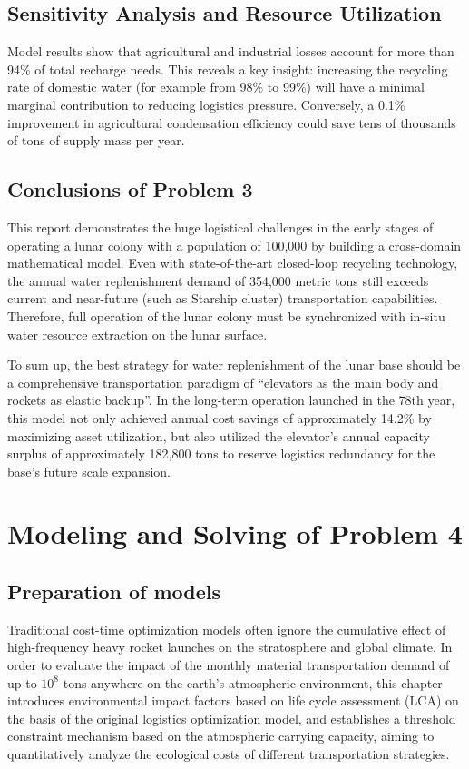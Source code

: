 \subsection{Sensitivity Analysis and Resource Utilization}
Model results show that agricultural and industrial losses account for more than 94\% of total recharge needs. This reveals a key insight: increasing the recycling rate of domestic water (for example from 98\% to 99\%) will have a minimal marginal contribution to reducing logistics pressure. Conversely, a 0.1\% improvement in agricultural condensation efficiency could save tens of thousands of tons of supply mass per year.

\subsection{Conclusions of Problem 3}
This report demonstrates the huge logistical challenges in the early stages of operating a lunar colony with a population of 100,000 by building a cross-domain mathematical model. Even with state-of-the-art closed-loop recycling technology, the annual water replenishment demand of 354,000 metric tons still exceeds current and near-future (such as Starship cluster) transportation capabilities. Therefore, full operation of the lunar colony must be synchronized with in-situ water resource extraction on the lunar surface.

To sum up, the best strategy for water replenishment of the lunar base should be a comprehensive transportation paradigm of “elevators as the main body and rockets as elastic backup”. In the long-term operation launched in the 78th year, this model not only achieved annual cost savings of approximately 14.2\% by maximizing asset utilization, but also utilized the elevator’s annual capacity surplus of approximately 182,800 tons to reserve logistics redundancy for the base’s future scale expansion.

\section{Modeling and Solving of Problem 4}
\subsection{Preparation of models}
Traditional cost-time optimization models often ignore the cumulative effect of high-frequency heavy rocket launches on the stratosphere and global climate.
In order to evaluate the impact of the monthly material transportation demand of up to $10^8$ tons anywhere on the earth's atmospheric environment, this chapter introduces environmental impact factors based on life cycle assessment (LCA) on the basis of the original logistics optimization model, and establishes a threshold constraint mechanism based on the atmospheric carrying capacity, aiming to quantitatively analyze the ecological costs of different transportation strategies.

